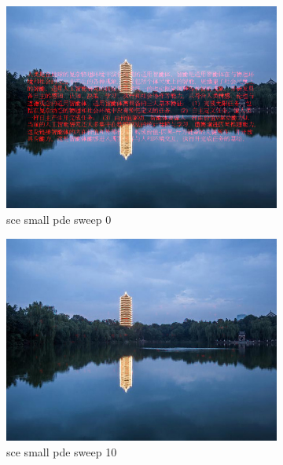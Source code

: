 \documentclass[11pt]{article}
\begin{document}
\begin{figure}[ht!]
    \centering
    \hfill%
    \begin{subfigure}[]{0.333\linewidth}
        \centering
        \includegraphics[width=\linewidth]{fig/restoration/sce_small/pde_0.jpg}
        \caption{sce small pde sweep 0}
    \end{subfigure}%
    \hfill%
    \begin{subfigure}[]{0.333\linewidth}
        \centering
        \includegraphics[width=\linewidth]{fig/restoration/sce_small/pde_10.jpg}
        \caption{sce small pde sweep 10}
    \end{subfigure}%
    \hfill%
    \begin{subfigure}[]{0.333\linewidth}

\end{subfigure}
\end{figure}
\end{document}
